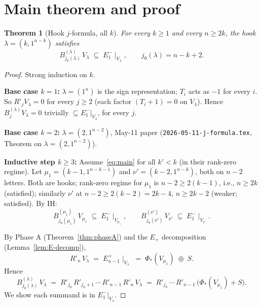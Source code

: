 \documentclass[11pt]{article}
\newtheorem{theorem}{Theorem}
\theoremstyle{definition}
\begin{document}
\section{Main theorem and proof}\label{sec:main}

\begin{theorem}[Hook $j$-formula, all $k$]\label{thm:main}
For every $k \ge 1$ and every $n \ge 2k$, the hook $\lambda = (k, 1^{n-k})$
satisfies
\begin{equation}\label{eq:main}
   B^{(\lambda)}_{j_0(\lambda)}\,V_\lambda
   \;\subseteq\; E_1^-\!\mid_{V_\lambda},
   \qquad
   j_0(\lambda) = n - k + 2.
\end{equation}
\end{theorem}

\begin{proof}
Strong induction on $k$.

\medskip\noindent\textbf{Base case $k = 1$:}
$\lambda = (1^n)$ is the sign representation; $T_i$ acts as $-1$ for
every $i$.  So $R'_j V_\lambda = 0$ for every $j \ge 2$ (each factor
$(T_i+1) = 0$ on $V_\lambda$).  Hence $B^{(\lambda)}_j V_\lambda = 0$
trivially $\subseteq E_1^-|_{V_\lambda}$, for every $j$.

\medskip\noindent\textbf{Base case $k = 2$:}
$\lambda = (2, 1^{n-2})$, May-11 paper
(\texttt{2026-05-11-j-formula.tex}, Theorem on $\lambda = (2, 1^{n-2})$).

\medskip\noindent\textbf{Inductive step $k \ge 3$:}
Assume~\eqref{eq:main} for all $k' < k$ (in their rank-zero regime).
Let $\mu_1 = (k-1, 1^{n-k-1})$ and $\nu' = (k-2, 1^{n-k})$, both on
$n - 2$ letters.  Both are hooks; rank-zero regime for $\mu_1$ is
$n - 2 \ge 2(k-1)$, i.e., $n \ge 2k$ (satisfied); similarly $\nu'$ at
$n - 2 \ge 2(k-2) = 2k - 4$, $n \ge 2k - 2$ (weaker; satisfied).
By IH:
\begin{equation}\label{eq:IH}
   B^{(\mu_1)}_{j_0(\mu_1)}\,V_{\mu_1} \;\subseteq\; E_1^-\!\mid_{V_{\mu_1}},
   \qquad
   B^{(\nu')}_{j_0(\nu')}\,V_{\nu'} \;\subseteq\; E_1^-\!\mid_{V_{\nu'}}.
\end{equation}

By Phase A (Theorem~\ref{thm:phaseA}) and the $E_+$ decomposition
(Lemma~\ref{lem:E-decomp}),
\[
   R'_n\,V_\lambda \;=\; E_{n-1}^+\!\mid_{V_\lambda}
   \;=\; \Phi_*(V_{\mu_1}) \;\oplus\; S.
\]
Hence
\[
   B^{(\lambda)}_{j_0(\lambda)}\,V_\lambda
   \;=\; R'_{j_0}\,R'_{j_0+1}\,\cdots\,R'_{n-1}\,R'_n\,V_\lambda
   \;=\; R'_{j_0}\,\cdots\,R'_{n-1}\,\big(\Phi_*(V_{\mu_1}) + S\big).
\]
We show each summand is in $E_1^-|_{V_\lambda}$.


\end{proof}
\end{document}
